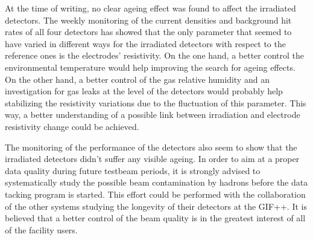 	At the time of writing, no clear ageing effect was found to affect the irradiated detectors. The weekly monitoring of the current densities and background hit rates of all four detectors has showed that the only parameter that seemed to have varied in different ways for the irradiated detectors with respect to the reference ones is the electrodes' resistivity. On the one hand, a better control the environmental temperature would help improving the search for ageing effects. On the other hand, a better control of the gas relative humidity and an investigation for gas leaks at the level of the detectors would probably help stabilizing the resistivity variations due to the fluctuation of this parameter. This way, a better understanding of a possible link between irradiation and electrode resistivity change could be achieved.
	
	The monitoring of the performance of the detectors also seem to show that the irradiated detectors didn't suffer any visible ageing. In order to aim at a proper data quality during future testbeam periods, it is strongly advised to systematically study the possible beam contamination by hadrons before the data tacking program is started. This effort could be performed with the collaboration of the other systems studying the longevity of their detectors at the GIF++. It is believed that a better control of the beam quality is in the greatest interest of all of the facility users.

\clearpage{\pagestyle{empty}\cleardoublepage}